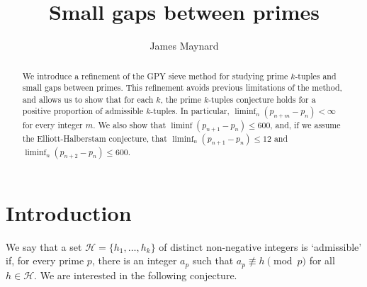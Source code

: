 \documentclass[12pt,a4paper]{amsart}
\theoremstyle{plain}
\numberwithin{sblmm}{thrm}
\numberwithin{equation}{section}
\begin{document}
\title{Small gaps between primes}
\author{James Maynard}
\address{Centre de recherches math\'ematiques,
Universit\'e de Montr\'eal,
Pavillon Andr\'e-Aisenstadt,
2920 Chemin de la tour, Room 5357,
Montr\'eal (Qu\'ebec) H3T 1J4}
\begin{abstract}
We introduce a refinement of the GPY sieve method for studying prime $k$-tuples and small gaps between primes. This refinement avoids previous limitations of the method, and allows us to show that for each $k$, the prime $k$-tuples conjecture holds for a positive proportion of admissible $k$-tuples. In particular, $\liminf_{n}(p_{n+m}-p_n)<\infty$ for every integer $m$. We also show that $\liminf(p_{n+1}-p_n)\le 600$, and, if we assume the Elliott-Halberstam conjecture, that $\liminf_n(p_{n+1}-p_n)\le 12$ and $\liminf_n (p_{n+2}-p_n)\le 600$.
\end{abstract}
\maketitle
\section{Introduction}
We say that a set $\mathcal{H}=\{h_1,\dotsc,h_k\}$ of distinct non-negative integers is `admissible' if, for every prime $p$, there is an integer $a_p$ such that $a_p\nequiv h\pmod{p}$ for all $h\in\mathcal{H}$. We are interested in the following conjecture.
\end{document}
